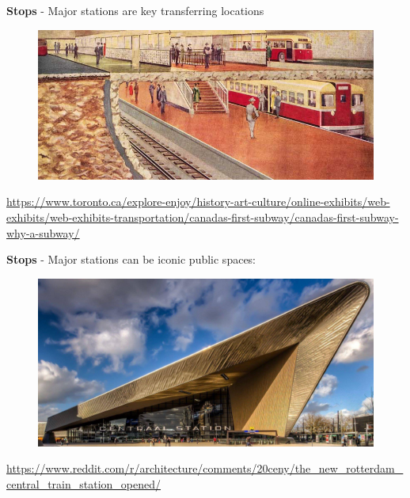 \documentclass[aspectratio=169]{beamer}
\begin{document}
\begin{frame}
	
	\textbf{Stops} - Major stations are key transferring locations
	
	\begin{figure}
		\centering
		\includegraphics[width=0.98\linewidth]{images/eglinton_old_toronto.jpg}
	\end{figure}

	\tiny\url{https://www.toronto.ca/explore-enjoy/history-art-culture/online-exhibits/web-exhibits/web-exhibits-transportation/canadas-first-subway/canadas-first-subway-why-a-subway/}
	
\end{frame}



\begin{frame}
	
	\textbf{Stops} - Major stations can be iconic public spaces:
	
	\begin{figure}
		\centering
		\includegraphics[width=0.98\linewidth]{images/rotterdam.jpg}
	\end{figure}

	\tiny\url{https://www.reddit.com/r/architecture/comments/20ceny/the_new_rotterdam_central_train_station_opened/}
	
\end{frame}
\end{document}
